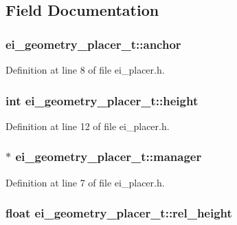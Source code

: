 \subsection{Field Documentation}
\hypertarget{structei__geometry__placer__t_a15ef38c40c297ac10bd479c6a41089fd}{
\subsubsection[{anchor}]{ {\bf ei\_\-geometry\_\-placer\_\-t::anchor}}}
\label{structei__geometry__placer__t_a15ef38c40c297ac10bd479c6a41089fd}


Definition at line 8 of file ei\_\-placer.h.\hypertarget{structei__geometry__placer__t_a52d0612ff524b4a058bc29000de5cecf}{
\subsubsection[{height}]{\setlength{\rightskip}{0pt plus 5cm}int {\bf ei\_\-geometry\_\-placer\_\-t::height}}}
\label{structei__geometry__placer__t_a52d0612ff524b4a058bc29000de5cecf}


Definition at line 12 of file ei\_\-placer.h.\hypertarget{structei__geometry__placer__t_a320ea8bfaeb574dd063bacc8d9fd6b95}{
\subsubsection[{manager}]{$\ast$ {\bf ei\_\-geometry\_\-placer\_\-t::manager}}}
\label{structei__geometry__placer__t_a320ea8bfaeb574dd063bacc8d9fd6b95}


Definition at line 7 of file ei\_\-placer.h.\hypertarget{structei__geometry__placer__t_a5948694b44ef0b05a7168667f7cfb3f9}{
\subsubsection[{rel\_\-height}]{\setlength{\rightskip}{0pt plus 5cm}float {\bf ei\_\-geometry\_\-placer\_\-t::rel\_\-height}}}
\label{structei__geometry__placer__t_a5948694b44ef0b05a7168667f7cfb3f9}


